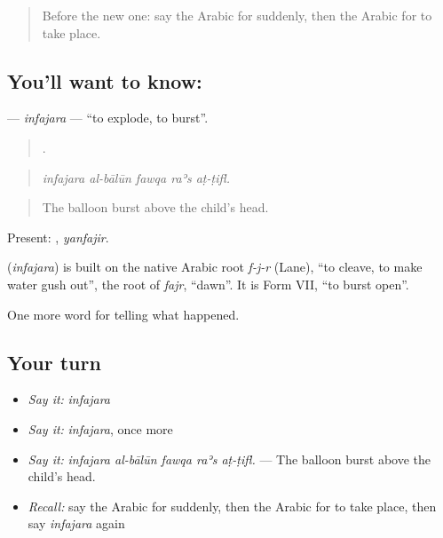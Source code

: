 \label{lesson:AR-C294-infajara}



\begin{quote}
Before the new one: say the Arabic for suddenly, then the Arabic for to take place.
\end{quote}

\subsection*{You'll want to know: }
\textbf{} — \emph{infajara} — \textquotedblleft{}to explode, to burst\textquotedblright{}.

\begin{quote}
    .
\end{quote}

\begin{quote}
\emph{infajara al-bālūn fawqa raʾs aṭ-ṭifl.}
\end{quote}

\begin{quote}
The balloon burst above the child’s head.
\end{quote}

Present: , \emph{yanfajir}.

\begin{cousinweb}
\textbf{} (\emph{infajara}) is built on the native Arabic root \emph{f-j-r} (Lane), \textquotedblleft{}to cleave, to make water gush out\textquotedblright{}, the root of \emph{fajr}, \textquotedblleft{}dawn\textquotedblright{}. It is Form VII, \textquotedblleft{}to burst open\textquotedblright{}.
\end{cousinweb}

\begin{grammarlens}[title={What you've built}]
One more word for telling what happened.
\end{grammarlens}

\subsection*{Your turn}
\begin{itemize}
\raggedright
  \item \emph{Say it:} \emph{infajara}
  \item \emph{Say it:} \emph{infajara}, once more
  \item \emph{Say it:} \emph{infajara al-bālūn fawqa raʾs aṭ-ṭifl.} — The balloon burst above the child’s head.
  \item \emph{Recall:} say the Arabic for suddenly, then the Arabic for to take place, then say \emph{infajara} again
\end{itemize}

